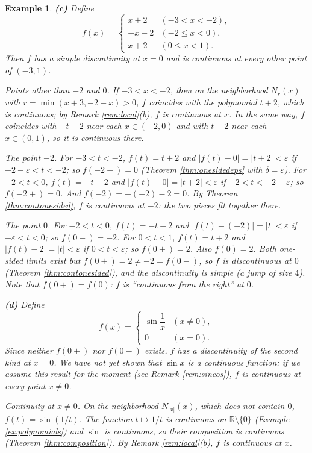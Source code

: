 \documentclass{article}
\theoremstyle{mythm}
\newtheorem{example}[theorem]{Example}
\begin{document}
\begin{example}
\textbf{(c)} Define
\[
f(x) = \begin{cases}
x + 2 & (-3 < x < -2), \\
-x - 2 & (-2 \leq x < 0), \\
x + 2 & (0 \leq x < 1).
\end{cases}
\]
Then $f$ has a simple discontinuity at $x = 0$ and is continuous at every other point of $(-3,1)$.

\textit{Points other than $-2$ and $0$.} If $-3 < x < -2$, then on the neighborhood $N_r(x)$ with $r = \min(x + 3, -2 - x) > 0$, $f$ coincides with the polynomial $t + 2$, which is continuous; by Remark \ref{rem:local}(b), $f$ is continuous at $x$. In the same way, $f$ coincides with $-t - 2$ near each $x \in (-2, 0)$ and with $t + 2$ near each $x \in (0,1)$, so it is continuous there.

\textit{The point $-2$.} For $-3 < t < -2$, $f(t) = t + 2$ and $|f(t) - 0| = |t + 2| < \varepsilon$ if $-2 - \varepsilon < t < -2$; so $f(-2-) = 0$ (Theorem \ref{thm:onesidedeps} with $\delta = \varepsilon$). For $-2 < t < 0$, $f(t) = -t - 2$ and $|f(t) - 0| = |t + 2| < \varepsilon$ if $-2 < t < -2 + \varepsilon$; so $f(-2+) = 0$. And $f(-2) = -(-2) - 2 = 0$. By Theorem \ref{thm:contonesided}, $f$ is continuous at $-2$: the two pieces fit together there.

\textit{The point $0$.} For $-2 < t < 0$, $f(t) = -t - 2$ and $|f(t) - (-2)| = |t| < \varepsilon$ if $-\varepsilon < t < 0$; so $f(0-) = -2$. For $0 < t < 1$, $f(t) = t + 2$ and $|f(t) - 2| = |t| < \varepsilon$ if $0 < t < \varepsilon$; so $f(0+) = 2$. Also $f(0) = 2$. Both one-sided limits exist but $f(0+) = 2 \neq -2 = f(0-)$, so $f$ is discontinuous at $0$ (Theorem \ref{thm:contonesided}), and the discontinuity is simple (a jump of size $4$). Note that $f(0+) = f(0)$: $f$ is ``continuous from the right'' at $0$.

\textbf{(d)} Define
\[
f(x) = \begin{cases} \sin \dfrac{1}{x} & (x \neq 0), \\[2mm] 0 & (x = 0). \end{cases}
\]
Since neither $f(0+)$ nor $f(0-)$ exists, $f$ has a discontinuity of the second kind at $x = 0$. We have not yet shown that $\sin x$ is a continuous function; if we assume this result for the moment (see Remark \ref{rem:sincos}), $f$ is continuous at every point $x \neq 0$.

\textit{Continuity at $x \neq 0$.} On the neighborhood $N_{|x|}(x)$, which does not contain $0$, $f(t) = \sin(1/t)$. The function $t \mapsto 1/t$ is continuous on $\mathbb{R}\setminus\{0\}$ (Example \ref{ex:polynomials}) and $\sin$ is continuous, so their composition is continuous (Theorem \ref{thm:composition}). By Remark \ref{rem:local}(b), $f$ is continuous at $x$.


\end{example}
\end{document}
